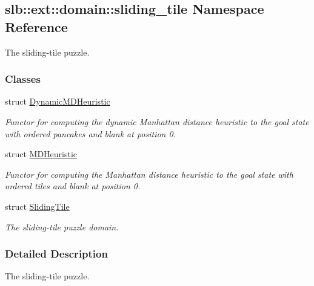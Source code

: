 \hypertarget{namespaceslb_1_1ext_1_1domain_1_1sliding__tile}{}\subsection{slb\+:\+:ext\+:\+:domain\+:\+:sliding\+\_\+tile Namespace Reference}
\label{namespaceslb_1_1ext_1_1domain_1_1sliding__tile}


The sliding-\/tile puzzle.  


\subsubsection*{Classes}
\begin{DoxyCompactItemize}
\item 
struct \hyperlink{structslb_1_1ext_1_1domain_1_1sliding__tile_1_1DynamicMDHeuristic}{Dynamic\+M\+D\+Heuristic}
\begin{DoxyCompactList}\small\item\em Functor for computing the dynamic Manhattan distance heuristic to the goal state with ordered pancakes and blank at position 0. \end{DoxyCompactList}\item 
struct \hyperlink{structslb_1_1ext_1_1domain_1_1sliding__tile_1_1MDHeuristic}{M\+D\+Heuristic}
\begin{DoxyCompactList}\small\item\em Functor for computing the Manhattan distance heuristic to the goal state with ordered tiles and blank at position 0. \end{DoxyCompactList}\item 
struct \hyperlink{structslb_1_1ext_1_1domain_1_1sliding__tile_1_1SlidingTile}{Sliding\+Tile}
\begin{DoxyCompactList}\small\item\em The sliding-\/tile puzzle domain. \end{DoxyCompactList}\end{DoxyCompactItemize}


\subsubsection{Detailed Description}
The sliding-\/tile puzzle. 